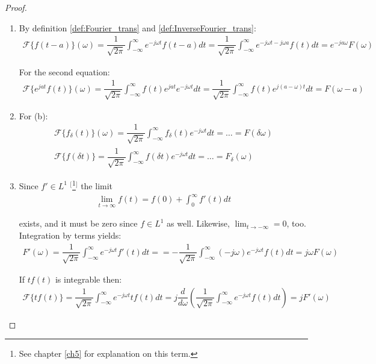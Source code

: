 \begin{proof}
\begin{enumerate}[label=(\alph*)]
\item
By definition \ref{def:Fourier_trans} and \ref{def:InverseFourier_trans}:
\begin{align*}
\mathcal{F}\{f(t-a)\}(\omega) = \dfrac{1}{\sqrt{2\pi}} \int_{-\infty}^\infty e^{-j\omega t} f(t - a) dt = \dfrac{1}{\sqrt{2\pi}} \int_{-\infty}^\infty e^{-j\omega t - j\omega a} f(t) dt = e^{-ja \omega} F(\omega)
\end{align*}

For the second equation:
\begin{align*}
\mathcal{F}\{e^{jat} f(t)\}(\omega) = \dfrac{1}{\sqrt{2\pi}} \int_{-\infty}^\infty f(t) e^{jat} e^{-j \omega t} dt = \dfrac{1}{\sqrt{2\pi}} \int_{-\infty}^\infty f(t) e^{j(a- \omega)t} dt = F(\omega - a)
\end{align*}

\item For (b):
\begin{align*}
\mathcal{F}\{f_\delta(t)\}(\omega) = \dfrac{1}{\sqrt{2\pi}} \int_{-\infty}^\infty f_\delta(t) e^{-j \omega t} dt = \dots = F(\delta\omega) \\
\mathcal{F}\{f(\delta t)\} = \dfrac{1}{\sqrt{2\pi}} \int_{-\infty}^\infty f(\delta t) e^{-j \omega t} dt = \dots = F_\delta(\omega)
\end{align*}

\item Since $f' \in L^1$ $^[$\footnote{See chapter \ref{ch5} for explanation on this term.}$^]$ the limit
\begin{align*}
\lim_{t \to \infty} f(t) = f(0) + \int_0^\infty f'(t) dt
\end{align*}

exists, and it must be zero since $f \in L^1$ as well. Likewise, $\lim_{t \to -\infty} = 0$, too. Integration by terms yields:
\begin{align*}
F'(\omega) = \dfrac{1}{\sqrt{2\pi}} \int_{-\infty}^\infty e^{-j \omega t} f'(t) dt =  = - \dfrac{1}{\sqrt{2\pi}} \int_{-\infty}^\infty (-j \omega) e^{-j \omega t} f(t) dt = j\omega F(\omega)
\end{align*}

If $tf(t)$ is integrable then:
\begin{align*}
\mathcal{F}\{tf(t)\} = \dfrac{1}{\sqrt{2\pi}} \int_{-\infty}^\infty e^{-j \omega t} t f(t) dt = j \dfrac{d}{d\omega} \left( \dfrac{1}{\sqrt{2\pi}} \int_{-\infty}^\infty e^{-j \omega t} f(t) dt \right) = j F'(\omega)
\end{align*}


\end{enumerate}
\end{proof}
